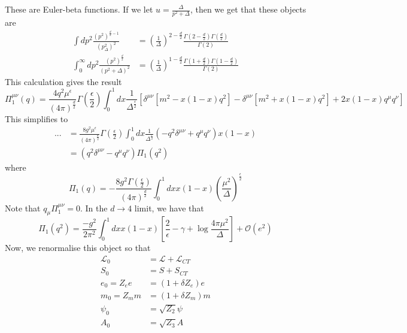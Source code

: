 \documentclass[11pt, oneside]{article}   	%
\theoremstyle{slanted}
\begin{document}
These are Euler-beta functions. 
If we let $ u  = \frac{\Delta }{ p ^ 2 + \Delta } $, 
then we get that these objects are 
\begin{align*}
\int d p ^ 2 \frac{\left( p ^ 2  \right)  ^{ \frac{d}{2 }  - 1 }  }{
\left( p ^ 2 _ \Delta  \right)  ^ 2   } &= \left( \frac{1}{\Delta }  \right)  
^{ 2 - \frac{d}{2 } } \frac{\Gamma \left( 2 - \frac{d}{2 }  \right)  \Gamma \left( \frac{d}{2 }  \right)   }{
\Gamma \left(  2  \right)  } \\
\int_ 0 ^ \infty dp ^2 \frac{\left( p ^ 2  \right)  ^{ \frac{d}{2    } }  }{ 
\left( p ^2 + \Delta  \right)  ^ 2 } & = \left( \frac{1}{\Delta }   \right) ^{ 1- \frac{d}{2 } } 
\frac{\Gamma \left( 1 + \frac{d}{2 }  \right)  \Gamma \left( 1 - \frac{d}{2 }  \right)   }{\Gamma \left( 2  \right)  }
\end{align*}
This calculation gives the result 
\[
\Pi _ 1 ^{ \mu \nu } \left( q  \right)    = 
\frac{4 q ^ 2 \mu ^{ \epsilon } }{ \left( 4 \pi  \right) ^{\frac{d}{2 }}} \Gamma \left( \frac{\epsilon}{2  }   \right) 
\int_ 0 ^ 1 dx \frac{1}{\Delta ^{ \frac{\epsilon}{2 } } } \left[ \delta ^{ \mu \nu } 
\left[  m ^ 2  - x \left( 1 - x  \right)  q ^ 2  \right]  - \delta ^{ \mu \nu } 
\left[  m ^ 2 + x \left( 1 - x   \right)  q ^ 2   \right]  + 2 x \left( 1 - x  \right)  q ^ \mu q ^ \nu \right] 
\]   
This simplifies to 
\begin{align*}
... & = \frac{8 g ^  2\mu ^{ \epsilon  } }{ \left( 4 \pi  \right)  ^{ \frac{d}{2 } }  } 
\Gamma \left( \frac{\epsilon}{2 }  \right)  \int_ 0 ^ 1 dx 
\frac{1}{ \Delta ^{ \frac{\epsilon}{2  } }  } \left( - q ^ 2 \delta ^{ \mu \nu } + q ^ \mu q ^ \nu  \right)  x \left( 1-  x  \right) \\
    &=  \left( q ^2 \delta ^{ \mu \nu }  - q ^ \mu q ^ \nu   \right)  \Pi _ 1 \left( q ^ 2   \right)  
\end{align*} where 
\[
\Pi_ 1 \left( q   \right)   = - \frac{8 g ^  2 \Gamma \left( \frac{\epsilon}{2 }  \right)    }{ 
\left( 4 \pi  \right)  ^{ \frac{d}{2 } }  } \int_ 0 ^ 1 dx x \left( 1 - x    \right)  \left( \frac{\mu  ^   2 }{ 
\Delta  }  \right) ^{ \frac{\epsilon}{2 }  }
\] Note that $ q _ \mu \Pi _ 1 ^{ \mu \nu }  = 0 $. 
In the $ d \to 4 $ limit, we 
have that 
\[
\Pi _ 1 \left( q ^ 2  \right)    = \frac{ - g ^ 2   }{ 2 \pi ^ 2 } 
\int_ 0 ^ 1 dx x \left( 1 - x  \right) \left[  \frac{2}{\epsilon } - \gamma + \log \frac{4 \pi \mu ^ 2 }{ \Delta }  \right]  + 
\mathcal{ O } \left(  e^ 2   \right) 
\] Now, we renormalise this object 
so that 
\begin{align*}
\mathcal{ L } _ 0  & = \mathcal{ L } + \mathcal{ L } _{ CT} \\
S _ 0 &=  S + S _{ CT  }  \\ 
e _ 0  = Z _ e  e & = \left(  1+ \delta Z _ e  \right)   e \\
m_ 0 =  Z _ m m &=  \left( 1 + \delta Z _ m  \right)  m  \\ 
\psi _ 0 &=  \sqrt{ Z  _  2 } \psi  \\ 
A _ 0 &=  \sqrt{ Z _ 3  }  A  
\end{align*}
\end{document}

